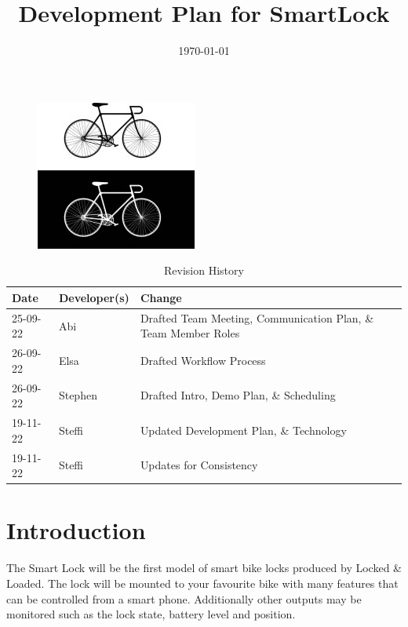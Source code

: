 \documentclass{article}
\title{Development Plan for SmartLock\\\progname}
\author{\authname}
\date{\today}
\begin{document}
\maketitle
\thispagestyle{empty}
\begin{figure}[h!]
  \centering
  \includegraphics[width=0.4\linewidth]{../BikeLogo.jpg}
\end{figure}

\newpage
{}
\begin{table}[hp]
\caption{Revision History} \label{TblRevisionHistory}
\begin{tabularx}{\textwidth}{llX}
\toprule
\textbf{Date} & \textbf{Developer(s)} & \textbf{Change}\\
\midrule
25-09-22 & Abi & Drafted Team Meeting, Communication Plan, \& Team Member Roles\\
26-09-22 & Elsa & Drafted Workflow Process\\
26-09-22 & Stephen & Drafted Intro, Demo Plan, \& Scheduling\\
19-11-22 & Steffi & Updated Development Plan, \& Technology\\
19-11-22 & Steffi & Updates for Consistency\\
\bottomrule

\end{tabularx}
\end{table}

\newpage
\tableofcontents

\newpage
{}
\section{Introduction}

The Smart Lock will be the first model of smart bike locks produced by Locked \& Loaded. The lock will be mounted to your favourite bike with many features that can be controlled from a smart phone. Additionally other outputs may be monitored such as the lock state, battery level and position.
\end{document}

